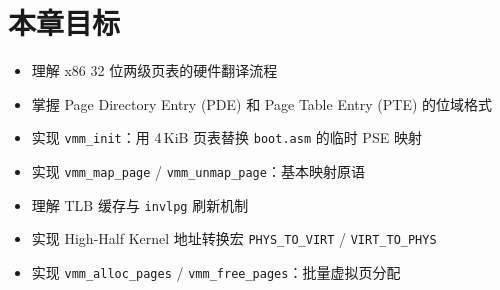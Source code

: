 \section{本章目标}

\begin{itemize}
  \item 理解 x86 32 位两级页表的硬件翻译流程
  \item 掌握 Page Directory Entry (PDE) 和 Page Table Entry (PTE) 的位域格式
  \item 实现 \texttt{vmm\_init}：用 4\,KiB 页表替换 \texttt{boot.asm} 的临时 PSE 映射
  \item 实现 \texttt{vmm\_map\_page} / \texttt{vmm\_unmap\_page}：基本映射原语
  \item 理解 TLB 缓存与 \texttt{invlpg} 刷新机制
  \item 实现 High-Half Kernel 地址转换宏 \texttt{PHYS\_TO\_VIRT} / \texttt{VIRT\_TO\_PHYS}
  \item 实现 \texttt{vmm\_alloc\_pages} / \texttt{vmm\_free\_pages}：批量虚拟页分配
\end{itemize}


